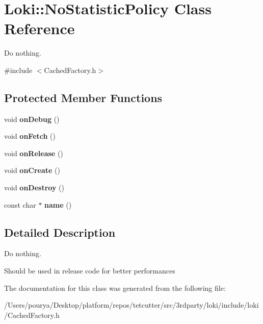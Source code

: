 \hypertarget{classLoki_1_1NoStatisticPolicy}{}\section{Loki\+:\+:No\+Statistic\+Policy Class Reference}
\label{classLoki_1_1NoStatisticPolicy}


Do nothing.  




{\ttfamily \#include $<$Cached\+Factory.\+h$>$}

\subsection*{Protected Member Functions}
\begin{DoxyCompactItemize}
\item 
\hypertarget{classLoki_1_1NoStatisticPolicy_a8cf6adc671ca4c8eef86d94cd0c04251}{}void {\bfseries on\+Debug} ()\label{classLoki_1_1NoStatisticPolicy_a8cf6adc671ca4c8eef86d94cd0c04251}

\item 
\hypertarget{classLoki_1_1NoStatisticPolicy_a16a71f855cc9b13f5e75ebcef3b1e505}{}void {\bfseries on\+Fetch} ()\label{classLoki_1_1NoStatisticPolicy_a16a71f855cc9b13f5e75ebcef3b1e505}

\item 
\hypertarget{classLoki_1_1NoStatisticPolicy_a7042ec0645787a37fad14c5212f351d4}{}void {\bfseries on\+Release} ()\label{classLoki_1_1NoStatisticPolicy_a7042ec0645787a37fad14c5212f351d4}

\item 
\hypertarget{classLoki_1_1NoStatisticPolicy_ae7f1419da67cb866e9524547a630772b}{}void {\bfseries on\+Create} ()\label{classLoki_1_1NoStatisticPolicy_ae7f1419da67cb866e9524547a630772b}

\item 
\hypertarget{classLoki_1_1NoStatisticPolicy_a8db2c4ee9d9e0c33b7261de6dad13dec}{}void {\bfseries on\+Destroy} ()\label{classLoki_1_1NoStatisticPolicy_a8db2c4ee9d9e0c33b7261de6dad13dec}

\item 
\hypertarget{classLoki_1_1NoStatisticPolicy_aa8a48060f623c45e77d3a08afe55104d}{}const char $\ast$ {\bfseries name} ()\label{classLoki_1_1NoStatisticPolicy_aa8a48060f623c45e77d3a08afe55104d}

\end{DoxyCompactItemize}


\subsection{Detailed Description}
Do nothing. 

Should be used in release code for better performances 

The documentation for this class was generated from the following file\+:\begin{DoxyCompactItemize}
\item 
/\+Users/pourya/\+Desktop/platform/repos/tetcutter/src/3rdparty/loki/include/loki/Cached\+Factory.\+h\end{DoxyCompactItemize}
